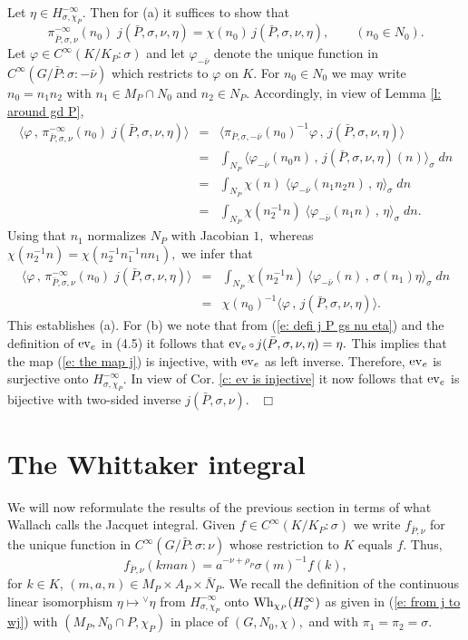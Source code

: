 \documentclass[12pt,a4paper]{article}
\def\proof{\par\noindent{\it Proof.}{\ }{\ }}
\def\qed{~\hfill\hbox{$\Box$}\medbreak}
\def\qquad{\quad\quad}
\def\gf{\varphi}
\def\gs{\sigma}
\def\inp#1#2{\langle#1\,,\,#2\rangle}
\def\after{\,{\scriptstyle\circ}\,}
\numberwithin{Thm}{section}
\numberwithin{equation}{section}
\def\Wh{{\rm Wh}}
\def\ev{{\rm ev}}
\numberwithin{equation}{section}
\def\cchi{\chi}
\def\gsP{\gs}%
\def\veec{\vee}%
\def\trw{{}^{\scriptscriptstyle\veec}}
\begin{document}
\proof 
Let $\eta \in H_{\gs,\cchi_P}^{-\infty}.$ Then for (a) it suffices to show that 
$$ 
\pi_{\bar P, \gs, \nu}^{-\infty}(n_0) \; j(\bar P , \gs, \nu,\eta) = \cchi(n_0)\, j(\bar P , \gs, \nu,\eta),
\qquad (n_0 \in N_0).
$$%
Let $\gf \in C^\infty(K/K_P: \gsP)$ and let $\gf_{-\bar\nu}$ denote
the unique function in $C^\infty(G/\bar P:\gs: -\bar \nu)$ which restricts to $\gf$ on $K.$ 
For $n_0 \in N_0$ 
we may write $n_0 = n_1 n_2$ with $n_1 \in M_P\cap N_0$ and $n_2 \in N_P.$ 
Accordingly, in view of Lemma \ref{l: around gd P},
%
\begin{eqnarray*}
\inp{\gf}{\pi_{\bar P, \gs, \nu}^{-\infty}(n_0) \; j(\bar P , \gs, \nu, \eta)}
& = & 
\inp{\pi_{\bar P,\gs , -\bar \nu }(n_0)^{-1} \gf}{ j(\bar P , \gs, \nu, \eta)}\\
& =& 
\int_{N_P} \inp{\gf _{-\bar \nu}(n_0 n)}{ j(\bar P , \gs, \nu, \eta)(n)}_\gs \; dn\\
&=& 
\int_{N_P} \cchi(n)\; \inp{ \gf _{-\bar \nu}(n_1 n_2 n)}{\eta}_\gs \; dn\\
& = & 
\int_{N_P} \cchi(n_2^{-1} n)\; \inp{\gf_{-\bar \nu} (n_1 n)}{\eta}_\gs\; dn.
\end{eqnarray*}
Using that $n_1$ normalizes $N_P$ with Jacobian $1,$ whereas 
$\cchi(n_2^{-1} n) = \cchi(n_2^{-1} n_1^{-1} n n_1),$ we infer that 
\begin{eqnarray*} 
\inp{\gf}{\pi_{\bar P, \gs, \nu}^{-\infty}(n_0) \; j(\bar P , \gs, \nu, \eta)}
&=& 
\int_{N_P} \cchi(n_2^{-1} n) \;\inp{\gf_{-\bar \nu} (n)}{\gs(n_1)\eta}_\gs\; dn\\
&=& 
\cchi(n_0)^{-1} \inp{\gf}{ j(\bar P , \gs, \nu, \eta)}.
\end{eqnarray*} 
This establishes (a). For (b) we note that from (\ref{e: defi j P gs nu eta}) and 
the definition of $\ev_e$ in (4.5) it follows that $\ev_e \after j(\bar P,\gs, \nu, \eta) = \eta.$ 
This implies that the map (\ref{e: the map j}) is injective, with $\ev_e$ as left inverse.
Therefore, $\ev_e$ is surjective onto $H_{\gs,\cchi_P}^{-\infty}.$ In view of Cor. \ref{c: ev is injective}
it now follows that $\ev_e$ is bijective with two-sided inverse $j(\bar P, \gs, \nu).$ 
\qed


\section{The Whittaker integral}
\label{s: whit int}
We will now reformulate the results of the previous section in terms of 
what Wallach \cite[\S 15.4.1]{Wrrg2} calls the Jacquet integral. Given $f \in C^\infty(K/K_P:\gs)$ we write
$f_{\bar P,\nu}$ for the unique function in $ C^\infty(G/\bar P:\gs: \nu)$ whose restriction to $K$ equals $f.$ Thus,
\begin{equation}
\label{e: extension f}
f_{\bar P, \nu}(kman) = a^{-\nu + \rho_P} \gs(m)^{-1} f(k),
\end{equation}
for $k \in K$, $(m,a,n) \in M_P\times A_P\times \bar N_P.$ 
We recall the definition of the continuous linear isomorphism $\eta \mapsto \trw\! \eta$ 
from $H_{\gs, \chi_P}^{-\infty}$ onto $\Wh_{\chi_P}(H_\gs^\infty)$ as given in 
(\ref{e: from j to wj}) with $(M_P, N_0 \cap P, \chi_P)$ in place of $(G, N_0, \chi),$ 
and with $\pi_1 = \pi_2 = \gs.$ 
\end{document}
